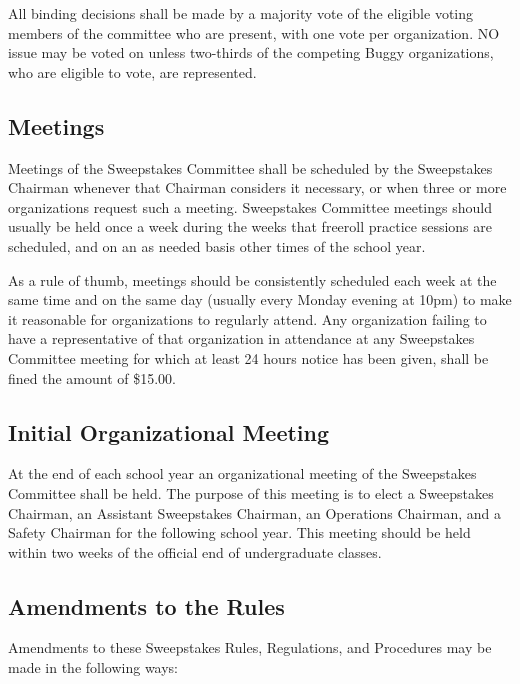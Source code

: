 	All binding decisions shall be made by a majority vote of the eligible voting members of the committee who are present, with one vote per organization. NO issue may be voted on unless two-thirds of the competing Buggy organizations, who are eligible to vote, are represented.

\subsection{Meetings}
\label{subsec:Meetings}

	Meetings of the Sweepstakes Committee shall be scheduled by the Sweepstakes Chairman whenever that Chairman considers it necessary, or when three or more organizations request such a meeting. Sweepstakes Committee meetings should usually be held once a week during the weeks that freeroll practice sessions are scheduled, and on an as needed basis other times of the school year.

	As a rule of thumb, meetings should be consistently scheduled each week at the same time and on the same day (usually every Monday evening at 10pm) to make it reasonable for organizations to regularly attend. Any organization failing to have a representative of that organization in attendance at any Sweepstakes Committee meeting for which at least 24 hours notice has been given, shall be fined the amount of \$15.00.

\subsection{Initial Organizational Meeting}

	At the end of each school year an organizational meeting of the Sweepstakes Committee shall be held. The purpose of this meeting is to elect a Sweepstakes Chairman, an Assistant Sweepstakes Chairman, an Operations Chairman, and a Safety Chairman for the following school year. This meeting should be held within two weeks of the official end of undergraduate classes. 

\subsection{Amendments to the Rules}

	Amendments to these Sweepstakes Rules, Regulations, and Procedures may be made in the following ways:

